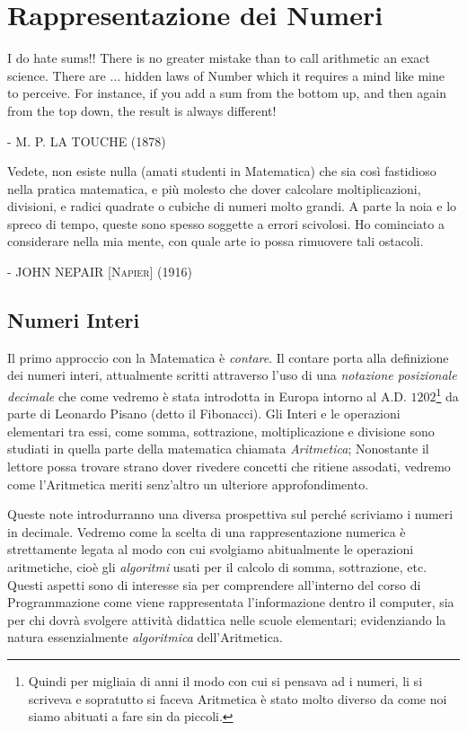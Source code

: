 
\chapter{Rappresentazione dei Numeri}

\epigraph{I do hate sums!! There is no greater mistake than to call arithmetic
an exact science. There are $\ldots$ hidden laws of Number which it requires a
mind like mine to perceive. For instance, if you add a sum from the bottom up,
and then again from the top down, the result is always different!}{ -
\textsc{M. P. LA TOUCHE} (1878)}

\epigraph{Vedete, non esiste nulla (amati studenti in Matematica) che sia così
fastidioso nella pratica matematica, e più molesto che dover calcolare
moltiplicazioni, divisioni, e radici quadrate o cubiche di numeri molto grandi.
A parte la noia e lo spreco di tempo, queste sono spesso soggette a errori
scivolosi. Ho cominciato a considerare nella mia mente, con quale arte io possa
rimuovere tali ostacoli.} { - \textsc{JOHN NEPAIR [Napier] (1916)}}

\section[Numeri Interi]{Numeri Interi}

Il primo approccio con la Matematica è \emph{contare}. Il contare porta alla
definizione dei numeri interi, attualmente scritti attraverso l'uso di una
\emph{notazione posizionale decimale} che come vedremo è stata introdotta in
Europa intorno al A.D. $1202$\footnote{Quindi per migliaia di anni il modo con
cui si pensava ad i numeri, li si scriveva e sopratutto si faceva Aritmetica è
stato molto diverso da come noi siamo abituati a fare sin da piccoli.} da parte
di Leonardo Pisano (detto il Fibonacci). Gli Interi e le operazioni elementari
tra essi, come somma, sottrazione, moltiplicazione e divisione sono studiati in
quella parte della matematica chiamata \emph{Aritmetica}; Nonostante il lettore
possa trovare strano dover rivedere concetti che ritiene assodati, vedremo come
l'Aritmetica meriti senz'altro un ulteriore approfondimento.

Queste note introdurranno una diversa prospettiva sul perché scriviamo i numeri
in decimale. Vedremo come la scelta di una rappresentazione numerica è
strettamente legata al modo con cui svolgiamo abitualmente le operazioni
aritmetiche, cioè gli \emph{algoritmi} usati per il calcolo di somma,
sottrazione, etc. Questi aspetti sono di interesse sia per comprendere
all'interno del corso di Programmazione come viene rappresentata l'informazione
dentro il computer, sia per chi dovrà svolgere attività didattica nelle scuole
elementari; evidenziando la natura essenzialmente \emph{algoritmica}
dell'Aritmetica.

